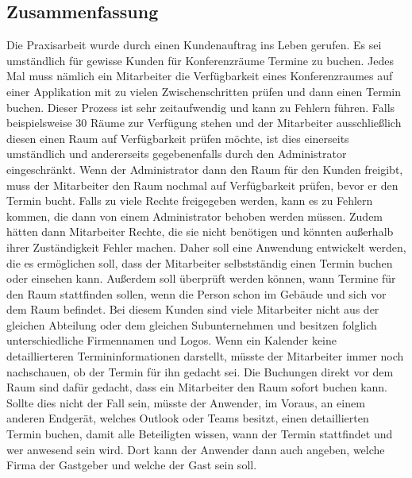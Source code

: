 
\subsection{Zusammenfassung}
Die Praxisarbeit wurde durch einen Kundenauftrag ins Leben gerufen.
Es sei umständlich für gewisse Kunden für Konferenzräume Termine zu buchen.
Jedes Mal muss nämlich ein Mitarbeiter die Verfügbarkeit eines Konferenzraumes auf einer Applikation mit zu vielen Zwischenschritten prüfen und dann einen Termin buchen.
Dieser Prozess ist sehr zeitaufwendig und kann zu Fehlern führen.
Falls beispielsweise 30 Räume zur Verfügung stehen und der Mitarbeiter ausschließlich diesen einen Raum auf Verfügbarkeit prüfen möchte, ist dies einerseits umständlich und andererseits gegebenenfalls durch den Administrator eingeschränkt.
Wenn der Administrator dann den Raum für den Kunden freigibt, muss der Mitarbeiter den Raum nochmal auf Verfügbarkeit prüfen, bevor er den Termin bucht.
Falls zu viele Rechte freigegeben werden, kann es zu Fehlern kommen,
die dann von einem Administrator behoben werden müssen.
Zudem hätten dann Mitarbeiter Rechte, die sie nicht benötigen und könnten außerhalb ihrer Zuständigkeit Fehler machen.
\newline
\newline
Daher soll eine Anwendung entwickelt werden, die es ermöglichen soll, dass der Mitarbeiter selbstständig einen Termin buchen oder einsehen kann.
Außerdem soll überprüft werden können, wann Termine für den Raum stattfinden sollen, wenn die Person schon im Gebäude und sich vor dem Raum befindet.
\newline
Bei diesem Kunden sind viele Mitarbeiter nicht aus der gleichen Abteilung oder dem gleichen Subunternehmen und besitzen folglich unterschiedliche Firmennamen und Logos.
Wenn ein Kalender keine detaillierteren Termininformationen darstellt, müsste der Mitarbeiter immer noch nachschauen, ob der Termin für ihn gedacht sei.
Die Buchungen direkt vor dem Raum sind dafür gedacht, dass ein Mitarbeiter den Raum sofort buchen kann.
\newline
Sollte dies nicht der Fall sein, müsste der Anwender, im Voraus, an einem anderen Endgerät, welches Outlook oder Teams besitzt, einen detaillierten Termin buchen, damit alle Beteiligten wissen, wann der Termin stattfindet und wer anwesend sein wird.
Dort kann der Anwender dann auch angeben, welche Firma der Gastgeber und welche der Gast sein soll.
